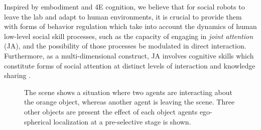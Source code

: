 \documentclass[letterpaper, 10 pt, conference]{ieeeconf}  %
\begin{document}
	Inspired by embodiment and 4E cognition, we believe that for social robots to leave the lab and adapt to human environments, it is crucial to provide them with forms of behavior regulation which take into account the dynamics of human low-level social skill processes, such as the capacity of engaging in \textit{joint attention} (JA), and the possibility of those processes be modulated in direct interaction. Furthermore, as a multi-dimensional construct, JA involves cognitive skills which constitute forms of social attention at distinct levels of interaction and knowledge sharing \cite{siposova2019}. 
	
	\begin{figure}[h!]
		\begin{center}
			\caption{The scene shows a situation where two agents are interacting about the orange object, whereas another agent is leaving the scene. Three other objects are present the effect of each object agents ego-spherical localization at a pre-selective stage is shown.}
			\label{fig:multi_robots}
		\end{center}
	\end{figure}
\end{document}
